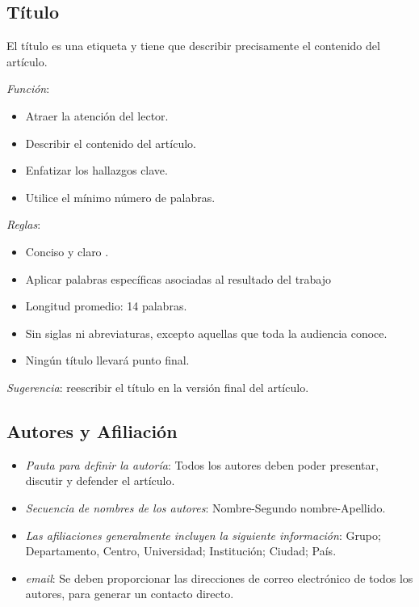 \documentclass[a4paper,12pt]{article}
\begin{document}
\subsection{Título}

El título es una etiqueta y tiene que describir precisamente el contenido del artículo.
\vspace{5mm} %

\textit{Función}:

\begin{itemize}
    \item Atraer la atención del lector.
    \item Describir el contenido del artículo.
    \item Enfatizar los hallazgos clave.
    \item Utilice el mínimo número de palabras.
\end{itemize}
\vspace{5mm} %

\textit{Reglas}:

\begin{itemize}
    \item Conciso y claro .
    \item Aplicar palabras específicas asociadas al resultado del trabajo
    \item Longitud promedio: 14 palabras.
    \item Sin siglas ni abreviaturas, excepto aquellas que toda la audiencia conoce.
    \item Ningún título llevará punto final.
\end{itemize}
\vspace{5mm} %

\textit{Sugerencia}: reescribir el título en la versión final del artículo. 

\subsection{Autores y Afiliación}

\begin{itemize}
    \item \textit{Pauta para definir la autoría}: Todos los autores deben poder presentar, discutir y defender el artículo.
    \item \textit{Secuencia de nombres de los autores}: Nombre-Segundo nombre-Apellido.
    \item \textit{Las afiliaciones generalmente incluyen la siguiente información}: Grupo; Departamento, Centro, Universidad; Institución; Ciudad; País.
    \item \textit{email}: Se deben proporcionar las direcciones de correo electrónico de todos los autores, para generar un contacto directo.
\end{itemize}
\end{document}
